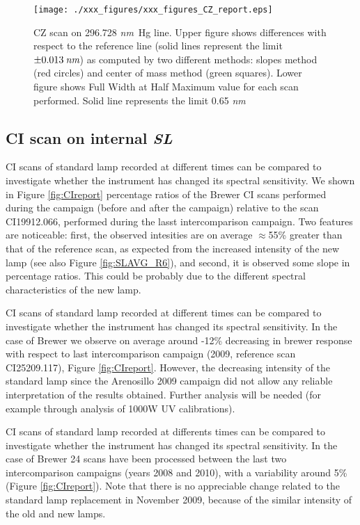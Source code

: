 \begin{figure}[hbtp!]
\begin{center}
\texttt{[image: ./xxx\_figures/xxx\_figures\_CZ\_report.eps]}
           \caption{CZ scan on 296.728 \emph{nm}\ Hg line. Upper figure shows differences with respect to the reference line (solid lines represent the limit $\pm0.013\:\emph{nm}$) as computed by two different methods: slopes method (red circles) and center of mass method (green squares). Lower figure shows Full Width at Half Maximum value for each scan performed. Solid line represents the limit 0.65 \emph{nm}}
	         \label{fig:CZreport}
\end{center}
\end{figure}

\subsection{CI scan on internal \emph{SL}} \label{subsec:CI}
CI scans of standard lamp recorded at different times can be compared to investigate whether the instrument has changed its spectral sensitivity. We shown in Figure \ref{fig:CIreport} percentage ratios of the Brewer \textbf{\brwname} CI scans performed during the campaign (before and after the campaign) relative to the scan CI19912.066, performed during the lasst intercomparison campaign. Two features are noticeable: first, the observed intesities are on average $\approx$55\% greater than that of the reference scan, as expected from the increased intensity of the new lamp (see also Figure \ref{fig:SLAVG_R6}), and second, it is observed some slope in percentage ratios. This could be probably due to the different spectral characteristics of the new lamp. 

CI scans of standard lamp recorded at different times can be compared to investigate whether the instrument has changed its spectral sensitivity. In the case of Brewer \textbf{\brwname} we observe on average around -12\% decreasing in brewer response with respect to last intercomparison campaign (2009, reference scan CI25209.117), Figure \ref{fig:CIreport}. However, the decreasing intensity of the standard lamp since the Arenosillo 2009 campaign did not allow any reliable interpretation of the results obtained. Further analysis will be needed (for example through analysis of 1000W UV calibrations).

CI scans of standard lamp recorded at differents times can be compared to investigate whether the instrument has changed its spectral sensitivity. In the case of Brewer \textbf{\brwname} 24 scans have been processed  between the last two intercomparison campaigns (years 2008 and 2010), with a variability around 5\% (Figure \ref{fig:CIreport}). Note that there is no appreciable change related to the standard lamp replacement in November 2009, because of the similar intensity of the old and new lamps.

